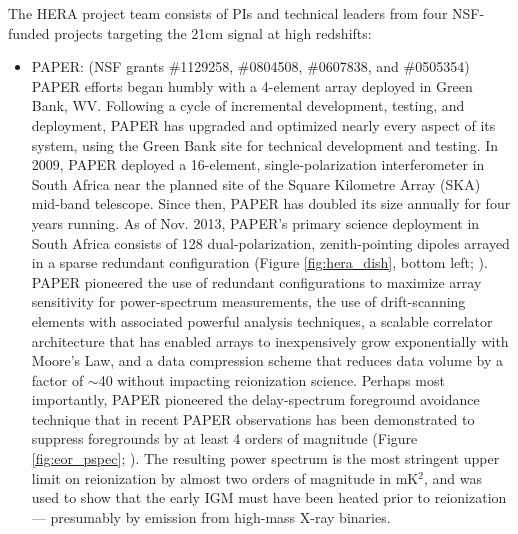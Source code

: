 \documentclass[preprint]{aastex}
\begin{document}
The HERA project team consists of PIs and technical leaders from four NSF-funded projects targeting the 21cm signal
at high redshifts:
\begin{itemize}[noitemsep,nolistsep]
\item{PAPER:} (NSF grants \#1129258, \#0804508, \#0607838, and \#0505354) PAPER efforts began humbly with a 4-element
array deployed in Green Bank, WV.  Following a cycle of incremental
development, testing, and deployment, PAPER has upgraded and optimized nearly every aspect of its system, using the Green Bank site
for technical development and testing.  In 2009, PAPER deployed a 16-element, single-polarization interferometer in South Africa
near the planned site of the Square Kilometre Array (SKA) mid-band telescope.  
Since then, PAPER has doubled its size annually for four years running.  As of Nov. 2013, PAPER's primary science
deployment in South Africa consists of 128 dual-polarization, zenith-pointing dipoles arrayed in a sparse redundant configuration
(Figure \ref{fig:hera_dish}, bottom left; \citealt{parsons_et_al2012a}).  PAPER pioneered the use of redundant configurations
to maximize array sensitivity for power-spectrum measurements, the use of drift-scanning elements with associated powerful
analysis techniques, a scalable correlator architecture that has enabled arrays to inexpensively grow exponentially
with Moore's Law, and a data compression scheme that reduces data volume by a factor of $\sim$40 without impacting
reionization science.  Perhaps most importantly, PAPER pioneered the delay-spectrum foreground avoidance technique \cite{parsons_et_al2012b}
that in recent PAPER observations has been demonstrated to suppress foregrounds by at least 4 orders of magnitude 
(Figure \ref{fig:eor_pspec}; \citealt{parsons_et_al2013}).  The resulting power spectrum is the most stringent upper
limit on reionization by almost two orders of magnitude in mK$^2$, and was used to show that the early IGM must have
been heated prior to reionization --- presumably by emission from high-mass X-ray binaries.


\end{itemize}
\end{document}
